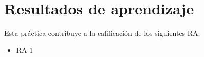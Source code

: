 \documentclass[a4paper]{article}
\begin{document}
\section*{Resultados de aprendizaje}
\label{sec:org000000c}
Esta práctica contribuye a la calificación de los siguientes RA:
\begin{itemize}
\item RA 1
\end{itemize}
\end{document}
